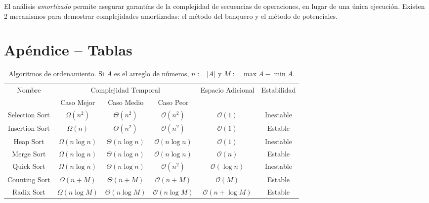 \documentclass{article}
\newcommand{\BigO}[1]{{\mathcal{O}(#1)}}
\newcommand{\BigOmega}[1]{{\Omega(#1)}}
\newcommand{\BigTheta}[1]{{\Theta(#1)}}
\begin{document}
El análisis \textit{amortizado} permite asegurar garantías de la complejidad de secuencias de operaciones, en lugar de una única ejecución. Existen 2 mecanismos para demostrar complejidades amortizadas: el método del banquero y el método de potenciales.




\appendix

\section{Apéndice -- Tablas}

\begin{table}[H]
    \centering
    \begin{tabular}{|c|c|c|c|c|c|}\hline
        \multirow{2}{*}{Nombre} & \multicolumn{3}{|c|}{Complejidad Temporal} & \multirow{2}{*}{Espacio Adicional} & \multirow{2}{*}{Estabilidad}                                    \\ \cline{2-4}
                                & Caso Mejor                                 & Caso Medio                         & Caso Peor                    &                      &           \\
        \hline
        Selection Sort          & $\BigOmega{n^2}$                           & $\BigTheta{n^2}$                   & $\BigO{n^2}$                 & $ \BigO{1} $         & Inestable \\
        \hline
        Insertion Sort          & $\BigOmega{n}$                             & $\BigTheta{n^2}$                   & $\BigO{n^2}$                 & $ \BigO{1} $         & Estable   \\
        \hline
        Heap Sort               & $\BigOmega{n \log{n}}$                     & $\BigTheta{n \log{n}}$             & $\BigO{n \log{n}}$           & $ \BigO{1} $         & Inestable \\
        \hline
        Merge Sort              & $\BigOmega{n \log{n}}$                     & $\BigTheta{n \log{n}}$             & $\BigO{n \log{n}}$           & $ \BigO{n} $         & Estable   \\
        \hline
        Quick Sort              & $\BigOmega{n \log{n}}$                     & $\BigTheta{n \log{n}}$             & $\BigO{n^2}$                 & $ \BigO{\log{n}} $   & Inestable \\
        \hline
        Counting Sort           & $\BigOmega{n+M}$                           & $\BigTheta{n+M}$                   & $\BigO{n+M}$                 & $ \BigO{M} $         & Estable   \\
        \hline
        Radix Sort              & $\BigOmega{n\log{M}}$                      & $\BigTheta{n\log{M}}$              & $\BigO{n\log{M}}$            & $ \BigO{n+\log{M}} $ & Estable   \\
        \hline
    \end{tabular}
    \caption*{Algoritmos de ordenamiento. Si $A$ es el arreglo de números, $n := |A|$ y $M := \max A - \min A$.}
    \label{tab:sorting}
\end{table}
\end{document}
